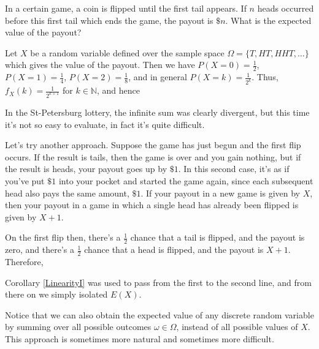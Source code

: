 \begin{examp}
In a certain game, a coin is flipped until the first tail appears. If $n$ heads occurred before this first tail which ends the game, the payout is $\$n$. What is the expected value of the payout?
\par
\noindent Let $X$ be a random variable defined over the sample space $\Omega = \{T, HT, HHT, \dots\}$ which gives the value of the payout. Then we have $P(X = 0) = \frac{1}{2}$, $P(X = 1) = \frac{1}{4}$, $P(X = 2) = \frac{1}{8}$, and in general $P(X = k) = \frac{1}{2^k}$. Thus, $f_X(k) = \frac{1}{2^{k+1}}$ for $k \in \mathbb{N}$, and hence
\par
\noindent In the St-Petersburg lottery, the infinite sum was clearly divergent, but this time it's not so easy to evaluate, in fact it's quite difficult.
\par
\noindent Let's try another approach. Suppose the game has just begun and the first flip occurs. If the result is tails, then the game is over and you gain nothing, but if the result is heads, your payout goes up by $\$1$. In this second case, it's as if you've put $\$1$ into your pocket and started the game again, since each subsequent head also pays the same amount, $\$1$. If your payout in a new game is given by $X$, then your payout in a game in which a single head has already been flipped is given by $X+1$.
\par
\noindent On the first flip then, there's a $\frac{1}{2}$ chance that a tail is flipped, and the payout is zero, and there's a $\frac{1}{2}$ chance that a head is flipped, and the payout is $X+1$. Therefore,
\par
\noindent Corollary \ref{LinearityI} was used to pass from the first to the second line, and from there on we simply isolated $E(X)$.
\end{examp}
\par
Notice that we can also obtain the expected value of any discrete random variable by summing over all possible outcomes $\omega \in \Omega$, instead of all possible values of $X$. This approach is sometimes more natural and sometimes more difficult.
